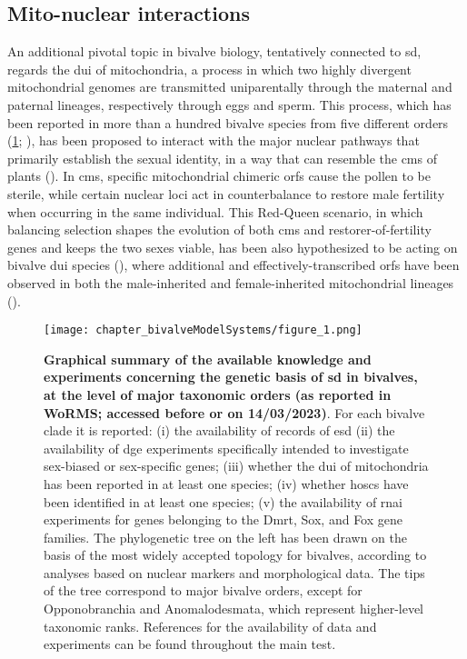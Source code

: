 \subsection{Mito-nuclear interactions}
An additional pivotal topic in bivalve biology, tentatively connected to \gls{sd}, regards the \gls{dui} of mitochondria, a process in which two highly divergent mitochondrial genomes are transmitted uniparentally through the maternal and paternal lineages, respectively through eggs and sperm. This process, which has been reported in more than a hundred bivalve species from five different orders (\cref{fig:summarySex}; ), has been proposed to interact with the major nuclear pathways that primarily establish the sexual identity, in a way that can resemble the \gls{cms} of plants (). In \gls{cms}, specific mitochondrial chimeric \glspl{orf} cause the pollen to be sterile, while certain nuclear loci act in counterbalance to restore male fertility when occurring in the same individual. This Red-Queen scenario, in which balancing selection shapes the evolution of both \gls{cms} and restorer-of-fertility genes and keeps the two sexes viable, has been also hypothesized to be acting on bivalve \gls{dui} species (), where additional and effectively-transcribed \glspl{orf} have been observed in both the male-inherited and female-inherited mitochondrial lineages ().

\begin{figure}[t!]
	\centering
	\texttt{[image: chapter\_bivalveModelSystems/figure\_1.png]}
	\caption[\textbf{Graphical summary of the available knowledge and experiments concerning the genetic basis of \gls{sd} in bivalves, at the level of major taxonomic orders (as reported in WoRMS; accessed before or on 14/03/2023)}]
	{
		\textbf{Graphical summary of the available knowledge and experiments concerning the genetic basis of \gls{sd} in bivalves, at the level of major taxonomic orders (as reported in WoRMS; accessed before or on 14/03/2023)}. For each bivalve clade it is reported: (i) the availability of records of \gls{esd} (ii) the availability of \gls{dge} experiments specifically intended to investigate sex-biased or sex-specific genes; (iii) whether the \gls{dui} of mitochondria has been reported in at least one species; (iv) whether \glspl{hosc} have been identified in at least one species; (v) the availability of \gls{rnai} experiments for genes belonging to the Dmrt, Sox, and Fox gene families. The phylogenetic tree on the left has been drawn on the basis of the most widely accepted topology for bivalves, according to analyses based on nuclear markers and morphological data. The tips of the tree correspond to major bivalve orders, except for Opponobranchia and Anomalodesmata, which represent higher-level taxonomic ranks. References for the availability of data and experiments can be found throughout the main test.
	}
	\label{fig:summarySex}
\end{figure}

